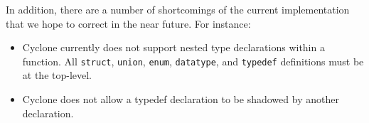 In addition, there are a number of shortcomings of the current
implementation that we hope to correct in the near future.  For
instance:
\begin{itemize}
\item Cyclone currently does not support nested type declarations
  within a function. All \texttt{struct}, \texttt{union}, \texttt{enum},
  \texttt{datatype}, and \texttt{typedef} definitions must
  be at the top-level.

\item Cyclone does not allow a typedef declaration to be shadowed by
another declaration.
\end{itemize}


